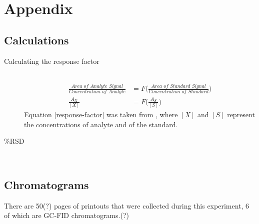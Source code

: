 \documentclass[a4paper, 12pt]{article}
\begin{document}

\section{Appendix}

\subsection{Calculations}

\begin{description}
	\item[Calculating the response factor] \hfill \\
		\begin{equation} \label{response-factor}
		\begin{split}
			\frac{\textit{Area of Analyte Signal}}{\textit{Concentration of Analyte}} & = F\Bigg(\frac{\textit{Area of Standard Signal}}{\textit{Concentration of Standard}}\Bigg) \\
			\frac{A_X}{[X]} & = F\Bigg(\frac{A_S}{[S]}\Bigg)
		\end{split}
		\end{equation}
			Equation \ref{response-factor} was taken from \cite{harris}, where $[X]$ and $[S]$ represent the concentrations of analyte and of the standard.

	\item[$\%$RSD] \hfill \\
\end{description}

\subsection{Chromatograms}
There are 50(?) pages of printouts that were collected during this experiment, 6 of which are GC-FID chromatograms.(?)


\end{document}
